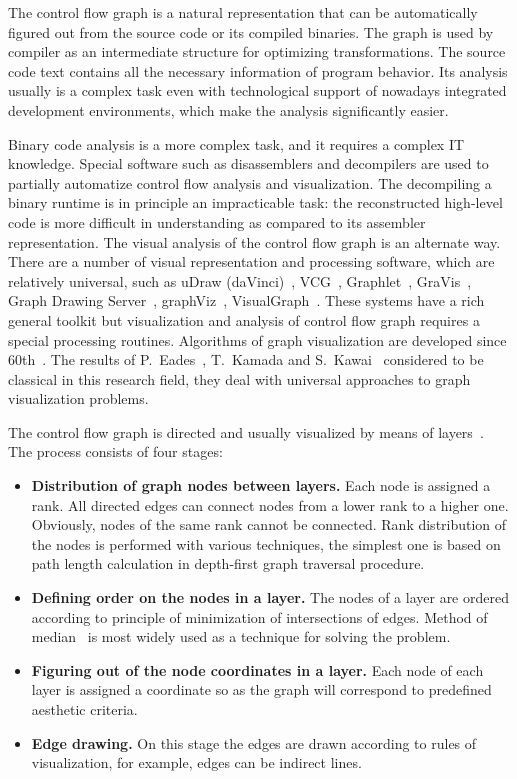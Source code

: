 \documentclass[conference]{IEEEtran}
\begin{document}
The control flow graph is a natural representation that can be automatically figured out from the source code or its compiled binaries.  The graph is used by compiler as an intermediate structure for optimizing transformations.  The source code text contains all the necessary information of program behavior.  Its analysis usually is a complex task even with technological support of nowadays integrated development environments, which make the analysis significantly easier.

Binary code analysis is a more complex task, and it requires a complex IT knowledge.  Special software such as disassemblers and decompilers are used to partially automatize control flow analysis and visualization.  The decompiling a binary runtime is in principle an impracticable task: the reconstructed high-level code is more difficult in understanding as compared to its assembler representation.  The visual analysis of the control flow graph is an alternate way.  There are a number of visual representation and processing software, which are relatively universal, such as uDraw (daVinci)~\cite{10}, VCG~\cite{14}, Graphlet~\cite{12}, GraVis~\cite{13}, Graph Drawing Server~\cite{9}, graphViz~\cite{11}, VisualGraph~\cite{15}.  These systems have a rich general toolkit but visualization and analysis of control flow graph requires a special processing routines. Algorithms of graph visualization are developed since 60th~\cite{7}.  The results of P.~Eades~\cite{5}, T.~Kamada and S.~Kawai~\cite{q1} considered to be classical in this research field, they deal with universal approaches to graph visualization problems.

The control flow graph is directed and usually visualized by means of layers~\cite{4}.  The process consists of four stages:
\begin{itemize}
\item [] \textbf{Distribution of graph nodes between layers.} Each node is assigned a rank.  All directed edges can connect nodes from a lower rank to a higher one.  Obviously, nodes of the same rank cannot be connected.  Rank distribution of the nodes is performed with various techniques, the simplest one is based on path length calculation in depth-first graph traversal procedure.
\item []\textbf{Defining order on the nodes in a layer.} The nodes of a layer are ordered according to principle of minimization of intersections of edges.  Method of median~\cite{8} is most widely used as a technique for solving the problem.
\item []\textbf{Figuring out of the node coordinates in a layer.} Each node of each layer is assigned a coordinate so as the graph will correspond to predefined aesthetic criteria.
\item []\textbf{Edge drawing.} On this stage the edges are drawn according to rules of visualization, for example, edges can be indirect lines.
\end{itemize}
\end{document}
